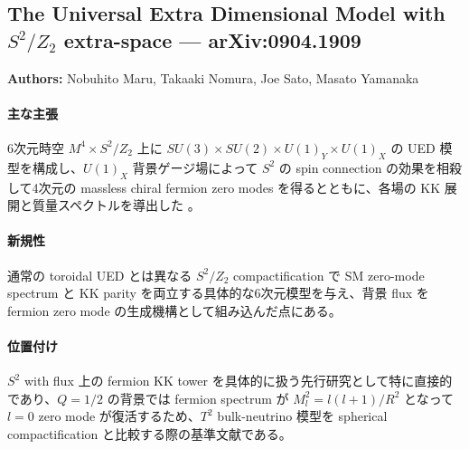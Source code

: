 \subsection{The Universal Extra Dimensional Model with $S^2/Z_2$ extra-space --- arXiv:0904.1909}

\textbf{Authors:} Nobuhito Maru, Takaaki Nomura, Joe Sato, Masato Yamanaka

\paragraph{主な主張}
6次元時空 $M^4\times S^2/Z_2$ 上に $SU(3)\times SU(2)\times U(1)_Y\times U(1)_X$ の UED 模型を構成し、$U(1)_X$ 背景ゲージ場によって $S^2$ の spin connection の効果を相殺して4次元の massless chiral fermion zero modes を得るとともに、各場の KK 展開と質量スペクトルを導出した \cite{Maru:2009S2UED}。

\paragraph{新規性}
通常の toroidal UED とは異なる $S^2/Z_2$ compactification で SM zero-mode spectrum と KK parity を両立する具体的な6次元模型を与え、背景 flux を fermion zero mode の生成機構として組み込んだ点にある。

\paragraph{位置付け}
$S^2$ with flux 上の fermion KK tower を具体的に扱う先行研究として特に直接的であり、$Q=1/2$ の背景では fermion spectrum が $M_l^2=l(l+1)/R^2$ となって $l=0$ zero mode が復活するため、$T^2$ bulk-neutrino 模型を spherical compactification と比較する際の基準文献である。